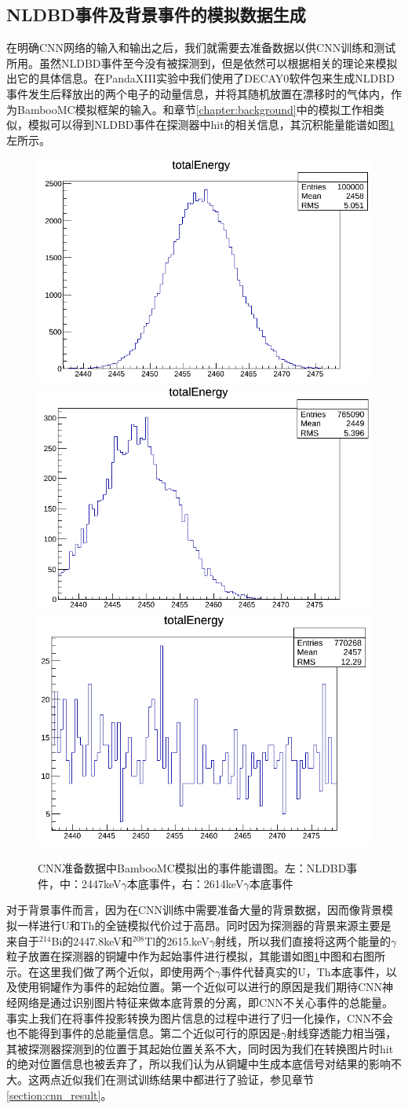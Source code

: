 \subsection{NLDBD事件及背景事件的模拟数据生成}

在明确CNN网络的输入和输出之后，我们就需要去准备数据以供CNN训练和测试所用。虽然NLDBD事件至今没有被探测到，但是依然可以根据相关的理论来模拟出它的具体信息。在PandaXIII实验中我们使用了DECAY0软件包\supercite{ponkratenko2000event}来生成NLDBD事件发生后释放出的两个电子的动量信息，并将其随机放置在漂移时的气体内，作为BambooMC模拟框架的输入。和章节\ref{chapter:background}中的模拟工作相类似，模拟可以得到NLDBD事件在探测器中hit的相关信息，其沉积能量能谱如图\ref{fig:nldbd_energy}左所示。

\begin{figure}
    \centering
    \includegraphics[width=0.3\columnwidth]{pic/nldbd_raw_spectrum.png}
    \includegraphics[width=0.3\columnwidth]{pic/2447_raw_spectrum.png}
    \includegraphics[width=0.3\columnwidth]{pic/2614_raw_spectrum.png}
    \caption{CNN准备数据中BambooMC模拟出的事件能谱图。左：NLDBD事件，中：2447keV$\gamma$本底事件，右：2614keV$\gamma$本底事件}
    \label{fig:nldbd_energy}
\end{figure}

对于背景事件而言，因为在CNN训练中需要准备大量的背景数据，因而像背景模拟一样进行U和Th的全链模拟代价过于高昂。同时因为探测器的背景来源主要是来自于$^{214}$Bi的2447.8keV和$^{208}$Tl的2615.keV$\gamma$射线，所以我们直接将这两个能量的$\gamma$粒子放置在探测器的铜罐中作为起始事件进行模拟，其能谱如图\ref{fig:nldbd_energy}中图和右图所示。在这里我们做了两个近似，即使用两个$\gamma$事件代替真实的U，Th本底事件，以及使用铜罐作为事件的起始位置。第一个近似可以进行的原因是我们期待CNN神经网络是通过识别图片特征来做本底背景的分离，即CNN不关心事件的总能量。事实上我们在将事件投影转换为图片信息的过程中进行了归一化操作，CNN不会也不能得到事件的总能量信息。第二个近似可行的原因是$\gamma$射线穿透能力相当强，其被探测器探测到的位置于其起始位置关系不大，同时因为我们在转换图片时hit的绝对位置信息也被丢弃了，所以我们认为从铜罐中生成本底信号对结果的影响不大。这两点近似我们在测试训练结果中都进行了验证，参见章节\ref{section:cnn_result}。


